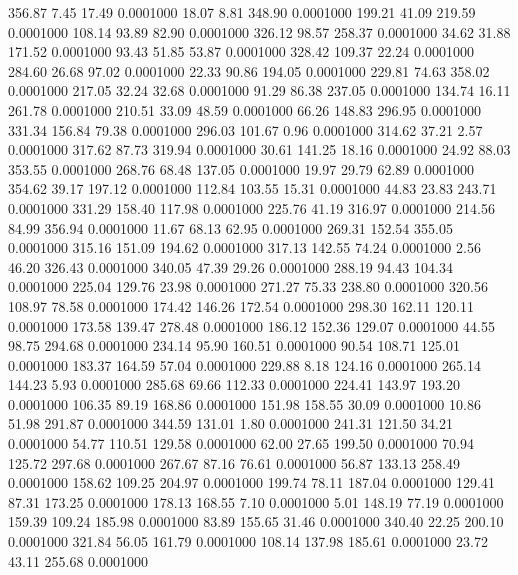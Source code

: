  356.87    7.45   17.49   0.0001000
  18.07    8.81  348.90   0.0001000
 199.21   41.09  219.59   0.0001000
 108.14   93.89   82.90   0.0001000
 326.12   98.57  258.37   0.0001000
  34.62   31.88  171.52   0.0001000
  93.43   51.85   53.87   0.0001000
 328.42  109.37   22.24   0.0001000
 284.60   26.68   97.02   0.0001000
  22.33   90.86  194.05   0.0001000
 229.81   74.63  358.02   0.0001000
 217.05   32.24   32.68   0.0001000
  91.29   86.38  237.05   0.0001000
 134.74   16.11  261.78   0.0001000
 210.51   33.09   48.59   0.0001000
  66.26  148.83  296.95   0.0001000
 331.34  156.84   79.38   0.0001000
 296.03  101.67    0.96   0.0001000
 314.62   37.21    2.57   0.0001000
 317.62   87.73  319.94   0.0001000
  30.61  141.25   18.16   0.0001000
  24.92   88.03  353.55   0.0001000
 268.76   68.48  137.05   0.0001000
  19.97   29.79   62.89   0.0001000
 354.62   39.17  197.12   0.0001000
 112.84  103.55   15.31   0.0001000
  44.83   23.83  243.71   0.0001000
 331.29  158.40  117.98   0.0001000
 225.76   41.19  316.97   0.0001000
 214.56   84.99  356.94   0.0001000
  11.67   68.13   62.95   0.0001000
 269.31  152.54  355.05   0.0001000
 315.16  151.09  194.62   0.0001000
 317.13  142.55   74.24   0.0001000
   2.56   46.20  326.43   0.0001000
 340.05   47.39   29.26   0.0001000
 288.19   94.43  104.34   0.0001000
 225.04  129.76   23.98   0.0001000
 271.27   75.33  238.80   0.0001000
 320.56  108.97   78.58   0.0001000
 174.42  146.26  172.54   0.0001000
 298.30  162.11  120.11   0.0001000
 173.58  139.47  278.48   0.0001000
 186.12  152.36  129.07   0.0001000
  44.55   98.75  294.68   0.0001000
 234.14   95.90  160.51   0.0001000
  90.54  108.71  125.01   0.0001000
 183.37  164.59   57.04   0.0001000
 229.88    8.18  124.16   0.0001000
 265.14  144.23    5.93   0.0001000
 285.68   69.66  112.33   0.0001000
 224.41  143.97  193.20   0.0001000
 106.35   89.19  168.86   0.0001000
 151.98  158.55   30.09   0.0001000
  10.86   51.98  291.87   0.0001000
 344.59  131.01    1.80   0.0001000
 241.31  121.50   34.21   0.0001000
  54.77  110.51  129.58   0.0001000
  62.00   27.65  199.50   0.0001000
  70.94  125.72  297.68   0.0001000
 267.67   87.16   76.61   0.0001000
  56.87  133.13  258.49   0.0001000
 158.62  109.25  204.97   0.0001000
 199.74   78.11  187.04   0.0001000
 129.41   87.31  173.25   0.0001000
 178.13  168.55    7.10   0.0001000
   5.01  148.19   77.19   0.0001000
 159.39  109.24  185.98   0.0001000
  83.89  155.65   31.46   0.0001000
 340.40   22.25  200.10   0.0001000
 321.84   56.05  161.79   0.0001000
 108.14  137.98  185.61   0.0001000
  23.72   43.11  255.68   0.0001000
